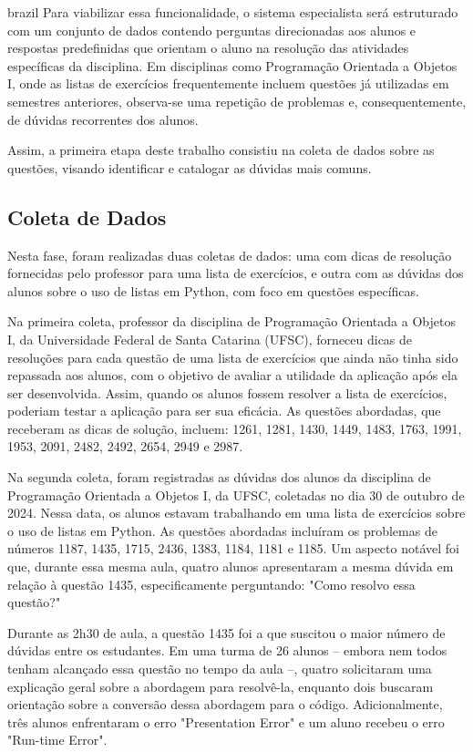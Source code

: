 \begin{otherlanguage*}{brazil}
Para viabilizar essa funcionalidade, o sistema especialista será estruturado com um conjunto de dados contendo perguntas direcionadas aos alunos e respostas predefinidas que orientam o aluno na resolução das atividades específicas da disciplina. Em disciplinas como Programação Orientada a Objetos I, onde as listas de exercícios frequentemente incluem questões já utilizadas em semestres anteriores, observa-se uma repetição de problemas e, consequentemente, de dúvidas recorrentes dos alunos.

Assim, a primeira etapa deste trabalho consistiu na coleta de dados sobre as questões, visando identificar e catalogar as dúvidas mais comuns.

\subsection{\textbf{Coleta de Dados}}

Nesta fase, foram realizadas duas coletas de dados: uma com dicas de resolução fornecidas pelo professor para uma lista de exercícios, e outra com as dúvidas dos alunos sobre o uso de listas em Python, com foco em questões específicas.

Na primeira coleta, professor da disciplina de Programação Orientada a Objetos I, da Universidade Federal de Santa Catarina (UFSC), forneceu dicas de resoluções para cada questão de uma lista de exercícios que ainda não tinha sido repassada aos alunos, com o objetivo de avaliar a utilidade da aplicação após ela ser desenvolvida. Assim, quando os alunos fossem resolver a lista de exercícios, poderiam testar a aplicação para ser sua eficácia. As questões abordadas, que receberam as dicas de solução, incluem: 1261, 1281, 1430, 1449, 1483, 1763, 1991, 1953, 2091, 2482, 2492, 2654, 2949 e 2987.

Na segunda coleta, foram registradas as dúvidas dos alunos da disciplina de Programação Orientada a Objetos I, da UFSC, coletadas no dia 30 de outubro de 2024. Nessa data, os alunos estavam trabalhando em uma lista de exercícios sobre o uso de listas em Python. As questões abordadas incluíram os problemas de números 1187, 1435, 1715, 2436, 1383, 1184, 1181 e 1185. Um aspecto notável foi que, durante essa mesma aula, quatro alunos apresentaram a mesma dúvida em relação à questão 1435, especificamente perguntando: "Como resolvo essa questão?"

Durante as 2h30 de aula, a questão 1435 foi a que suscitou o maior número de dúvidas entre os estudantes. Em uma turma de 26 alunos – embora nem todos tenham alcançado essa questão no tempo da aula –, quatro solicitaram uma explicação geral sobre a abordagem para resolvê-la, enquanto dois buscaram orientação sobre a conversão dessa abordagem para o código. Adicionalmente, três alunos enfrentaram o erro "Presentation Error" e um aluno recebeu o erro "Run-time Error".


\end{otherlanguage*}
